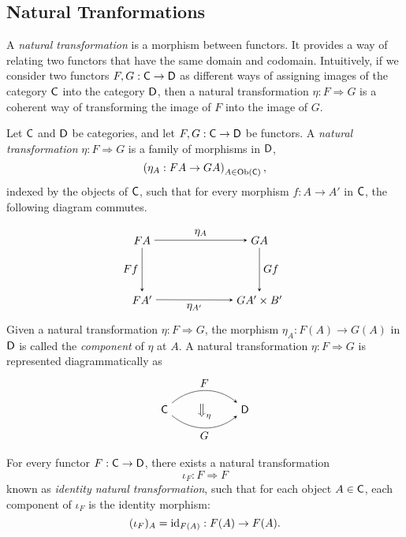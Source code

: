 \subsection{Natural Tranformations}
A \emph{natural transformation} is a morphism between functors. It provides a way of relating two functors that have the same domain and codomain. Intuitively, if we consider two functors $F, G : \mathsf{C} \to \mathsf{D}$ as different ways of assigning images of the category $\mathsf{C}$ into the category $\mathsf{D}$, then a natural transformation $\eta : F \Rightarrow G$ is a coherent way of transforming the image of $F$ into the image of $G$.

\begin{definition}
  Let $\mathsf{C}$ and $\mathsf{D}$ be categories, and let $F, G : \mathsf{C} \to \mathsf{D}$ be functors. A \emph{natural transformation} $\eta : F \Rightarrow G$ is a family of morphisms in $\mathsf{D}$,
\[
\left( \eta_A : FA \to GA \right)_{A \in \mathrm{Ob}(\mathsf{C})},
\]
indexed by the objects of $\mathsf{C}$, such that for every morphism $f : A \to A'$ in $\mathsf{C}$, the following diagram commutes. 

\[
\begin{tikzpicture}
  \matrix (m) [matrix of math nodes,row sep=4em,column sep=7em,minimum width=2em]
  {
   FA  & GA  \\
    FA'  & GA' \times B'  \\
  };
  \path[-stealth]
    (m-1-1) edge  node [above] {$\eta_A$} (m-1-2)
    (m-2-1) edge  node [below] {$\eta_{A'}$} (m-2-2)
    (m-1-1) edge  node [left] {$Ff$} (m-2-1)
    (m-1-2) edge  node [right] {$Gf$} (m-2-2)
    ;
\end{tikzpicture}
\]
Given a natural transformation \(\eta : F \Rightarrow G\), the morphism \(\eta_A : F(A) \to G(A)\) in \(\mathsf{D}\) is called the \emph{component} of \(\eta\) at \(A\).
A natural transformation $\eta : F \Rightarrow G$ is represented diagrammatically as 
\[
\begin{tikzpicture}
  \matrix (m) [matrix of math nodes,row sep=0.4em,column sep=2em,minimum width=1em]
  {
   \catC   & \big\Downarrow_{\eta} & \catD \\
  };
  \path[-stealth]
    (m-1-1) edge [bend left=40] node [above] {$F$} (m-1-3)
    (m-1-1) edge [bend left=-40] node [below] {$G$} (m-1-3)
    ;
\end{tikzpicture}
\]

\end{definition}


\begin{example}
  For every functor $F : \mathsf{C} \to \mathsf{D}$, there exists a natural transformation
  \[
    \iota_F : F \Rightarrow F
  \]
  known as  \emph{identity natural transformation},  such that for each object $A \in \mathsf{C}$, each component of $\iota_F$ is the identity morphism:
  \[
    (\iota_F)_A = \mathrm{id}_{F(A)} : F(A) \to F(A).
    \] 
\end{example}

